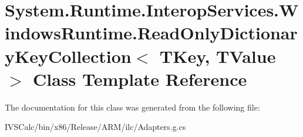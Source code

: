 \hypertarget{class_system_1_1_runtime_1_1_interop_services_1_1_windows_runtime_1_1_read_only_dictionary_key_collection}{}\section{System.\+Runtime.\+Interop\+Services.\+Windows\+Runtime.\+Read\+Only\+Dictionary\+Key\+Collection$<$ T\+Key, T\+Value $>$ Class Template Reference}
\label{class_system_1_1_runtime_1_1_interop_services_1_1_windows_runtime_1_1_read_only_dictionary_key_collection}


The documentation for this class was generated from the following file\+:\begin{DoxyCompactItemize}
\item 
I\+V\+S\+Calc/bin/x86/\+Release/\+A\+R\+M/ilc/Adapters.\+g.\+cs\end{DoxyCompactItemize}
